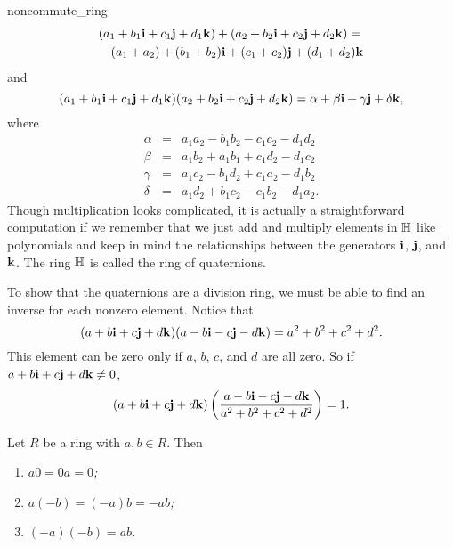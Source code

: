 \begin{example}{noncommute_ring}
\begin{eqnarray*}
\lefteqn{ (a_1 + b_1 {\bold i}  + c_1 {\bold j} +d_1 {\bold k} )
+ ( a_2 + b_2 {\bold i}  + c_2 {\bold j} +d_2 {\bold k} )
= } \\
& & (a_1 + a_2) + ( b_1 + b_2) {\bold i}  + ( c_1 + c_2)
{\bold j} + ( d_1 + d_2) {\bold k}
\end{eqnarray*}
and
\[
(a_1 + b_1 {\bold i}  + c_1 {\bold j} +d_1 {\bold k} ) ( a_2 + b_2
{\bold i}  + c_2 {\bold j} +d_2 {\bold k} ) = \alpha + \beta {\bold
i}  + \gamma {\bold j} + \delta {\bold k},
\]
where
\begin{eqnarray*}
\alpha & = & a_1 a_2 - b_1 b_2 - c_1 c_2 -d_1 d_2 \\
\beta & = & a_1 b_2 + a_1 b_1 + c_1 d_2 - d_1 c_2 \\
\gamma & = & a_1 c_2 - b_1 d_2 + c_1 a_2 - d_1 b_2 \\
\delta & = & a_1 d_2 + b_1 c_2 - c_1 b_2 - d_1 a_2.
\end{eqnarray*}
Though multiplication looks complicated, it is actually a
straightforward computation if we remember that we just add and
multiply elements in ${\Bbb H}$ like polynomials and keep in mind the
relationships between the generators ${\bold i}$, ${\bold j}$, and
${\bold k}$. The ring ${\Bbb H}$ is called the ring of {\bfi
quaternions}.
 
 
To show that the quaternions are a division ring, we must be able to
find an inverse for each nonzero element. Notice that 
\[
( a + b {\bold i}  + c {\bold j} +d {\bold k} )( a - b
{\bold i}  - c {\bold j}
-d {\bold k} ) = a^2 + b^2 + c^2 + d^2.
\]
This element can be zero only if $a$, $b$, $c$, and $d$ are
all zero. So if $a + b {\bold i}  + c {\bold j} +d {\bold k}
\neq 0$,
\[
( a + b {\bold i}  + c {\bold j} +d {\bold k} )
\left(
\frac{a - b {\bold i} - c {\bold j} - d {\bold k} }{ a^2 + b^2 + c^2
+ d^2 }
\right)
= 1.
\]
\end{example}
 
 
\begin{proposition}
Let $R$ be a ring with $a, b \in R$. Then
\begin{enumerate}
 
\rm \item \it
$a0 = 0a = 0$;
 
\rm \item \it
$a(-b) = (-a)b = -ab$;
 
\rm \item \it
$(-a)(-b) =ab$.
 
\end{enumerate}
\end{proposition}
 
